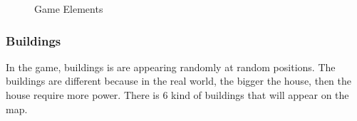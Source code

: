 \begin{figure}[!ht]
\centering
{}
\caption{Game Elements}
\end{figure}

\subsubsection*{Buildings}
In the game, buildings is are appearing randomly at random positions. The buildings are different
because in the real world, the bigger the house, then the house require more power. There is 6 kind
of buildings that will appear on the map. 

